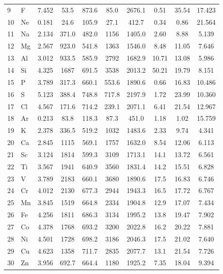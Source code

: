 \documentclass[11pt,a4paper]{article}
\begin{document}
\begin{longtable}{@{}llcccccccc@{}}
		9  & F   & 7.452 & 53.5   & 873.6  & 85.0   & 2676.1 & 0.51  & 35.54 & 17.423 \\
		10 & Ne  & 0.181 & 24.6   & 105.9  & 27.1   & 412.7  & 0.34  & 0.86  & 21.564 \\
		11 & Na  & 2.134 & 371.0  & 482.0  & 1156   & 1405.0 & 2.60  & 8.88  & 5.139 \\
		12 & Mg  & 2.567 & 923.0  & 541.8  & 1363   & 1546.0 & 8.48  & 11.05 & 7.646 \\
		13 & Al  & 3.012 & 933.5  & 585.9  & 2792   & 1682.9 & 10.71 & 13.08 & 5.986 \\
		14 & Si  & 4.325 & 1687   & 691.5  & 3538   & 2013.2 & 50.21 & 19.79 & 8.151 \\
		15 & P   & 3.789 & 317.3  & 660.1  & 553.6  & 1890.6 & 0.66  & 16.83 & 10.486 \\
		16 & S   & 5.123 & 388.4  & 748.8  & 717.8  & 2197.9 & 1.72  & 23.99 & 10.360 \\
		17 & Cl  & 4.567 & 171.6  & 714.2  & 239.1  & 2071.1 & 6.41  & 21.54 & 12.967 \\
		18 & Ar  & 0.213 & 83.8   & 118.3  & 87.3   & 451.0  & 1.18  & 1.02  & 15.759 \\
		19 & K   & 2.378 & 336.5  & 519.2  & 1032   & 1483.6 & 2.33  & 9.74  & 4.341 \\
		20 & Ca  & 2.845 & 1115   & 569.1  & 1757   & 1632.0 & 8.54  & 12.06 & 6.113 \\
		21 & Sc  & 3.124 & 1814   & 599.3  & 3109   & 1713.1 & 14.1  & 13.72 & 6.561 \\
		22 & Ti  & 3.567 & 1941   & 640.9  & 3560   & 1831.4 & 14.2  & 15.51 & 6.828 \\
		23 & V   & 3.789 & 2183   & 660.1  & 3680   & 1890.6 & 17.5  & 16.83 & 6.746 \\
		24 & Cr  & 4.012 & 2130   & 677.3  & 2944   & 1943.3 & 16.5  & 17.72 & 6.767 \\
		25 & Mn  & 3.845 & 1519   & 664.8  & 2334   & 1904.8 & 12.9  & 17.07 & 7.434 \\
		26 & Fe  & 4.256 & 1811   & 686.3  & 3134   & 1995.2 & 13.8  & 19.47 & 7.902 \\
		27 & Co  & 4.378 & 1768   & 693.2  & 3200   & 2022.8 & 16.2  & 20.22 & 7.881 \\
		28 & Ni  & 4.501 & 1728   & 698.2  & 3186   & 2046.3 & 17.5  & 21.02 & 7.640 \\
		29 & Cu  & 4.623 & 1358   & 711.7  & 2835   & 2077.7 & 13.1  & 21.54 & 7.726 \\
		30 & Zn  & 3.956 & 692.7  & 664.4  & 1180   & 1925.2 & 7.35  & 18.04 & 9.394 \\

\end{longtable}
\end{document}

